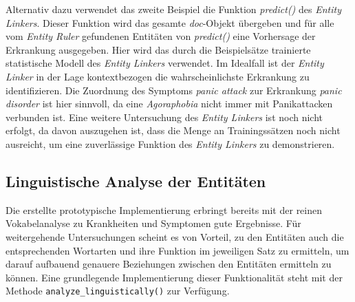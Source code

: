 Alternativ dazu verwendet das zweite Beispiel die Funktion \emph{predict()} des \emph{Entity Linkers}. Dieser Funktion wird das gesamte \emph{doc}-Objekt übergeben und für alle vom \emph{Entity Ruler} gefundenen Entitäten von \emph{predict()} eine Vorhersage der Erkrankung ausgegeben. Hier wird das durch die Beispielsätze trainierte statistische Modell des \emph{Entity Linkers} verwendet. Im Idealfall ist der \emph{Entity Linker} in der Lage kontextbezogen die wahrscheinlichste Erkrankung zu identifizieren. Die Zuordnung des Symptoms \emph{panic attack} zur Erkrankung \emph{panic disorder} ist hier sinnvoll, da eine \emph{Agoraphobia} nicht immer mit Panikattacken verbunden ist. Eine weitere Untersuchung des \emph{Entity Linkers} ist noch nicht erfolgt, da davon auszugehen ist, dass die Menge an Trainingssätzen noch nicht ausreicht, um eine zuverlässige Funktion des \emph{Entity Linkers} zu demonstrieren.

\subsection{Linguistische Analyse der Entitäten}

Die erstellte prototypische Implementierung erbringt bereits mit der reinen Vokabelanalyse zu Krankheiten und Symptomen gute Ergebnisse. Für weitergehende Untersuchungen scheint es von Vorteil, zu den Entitäten auch die entsprechenden Wortarten und ihre Funktion im jeweiligen Satz zu ermitteln, um darauf aufbauend genauere Beziehungen zwischen den Entitäten ermitteln zu können. Eine grundlegende Implementierung dieser Funktionalität steht mit der Methode \lstinline{analyze_linguistically()} zur Verfügung.

